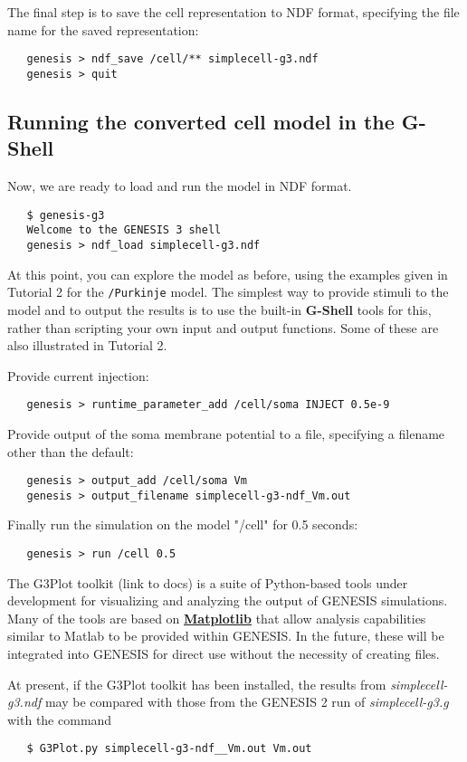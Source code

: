 \documentclass[12pt]{article}
\begin{document}
The final step is to save the cell representation to NDF format,
specifying the file name for the saved representation:
\begin{verbatim}
   genesis > ndf_save /cell/** simplecell-g3.ndf
   genesis > quit
\end{verbatim}

\subsection*{Running the converted cell model in the G-Shell}

Now, we are ready to load and run the model in NDF format.
\begin{verbatim}
   $ genesis-g3
   Welcome to the GENESIS 3 shell
   genesis > ndf_load simplecell-g3.ndf
\end{verbatim}
At this point, you can explore the model as before, using the examples
given in Tutorial 2 for the {\tt /Purkinje} model.  The simplest
way to provide stimuli to the model and to output the results
is to use the built-in {\bf G-Shell} tools for this, rather than scripting
your own input and output functions.  Some of these are also illustrated
in Tutorial 2.

Provide current injection:
\begin{verbatim}
   genesis > runtime_parameter_add /cell/soma INJECT 0.5e-9
\end{verbatim}

Provide output of the soma membrane potential to a file, specifying
a filename other than the default:
\begin{verbatim}
   genesis > output_add /cell/soma Vm
   genesis > output_filename simplecell-g3-ndf_Vm.out
\end{verbatim}

Finally run the simulation on the model "/cell" for 0.5 seconds:
\begin{verbatim}
   genesis > run /cell 0.5
\end{verbatim}

The G3Plot toolkit (link to docs) is a suite of Python-based tools under
development for visualizing and analyzing the output of GENESIS
simulations.  Many of the tools are based on \href{http://matplotlib.sourceforge.net/}{\bf Matplotlib} that allow analysis
capabilities similar to Matlab to be provided within GENESIS.
In the future, these will be integrated into GENESIS for direct use
without the necessity of creating files.

At present, if the G3Plot toolkit has been installed, the results from
{\it simplecell-g3.ndf} may be compared with those from the GENESIS 2 run of
{\it simplecell-g3.g} with the command
\begin{verbatim}
   $ G3Plot.py simplecell-g3-ndf__Vm.out Vm.out
\end{verbatim}
\end{document}

